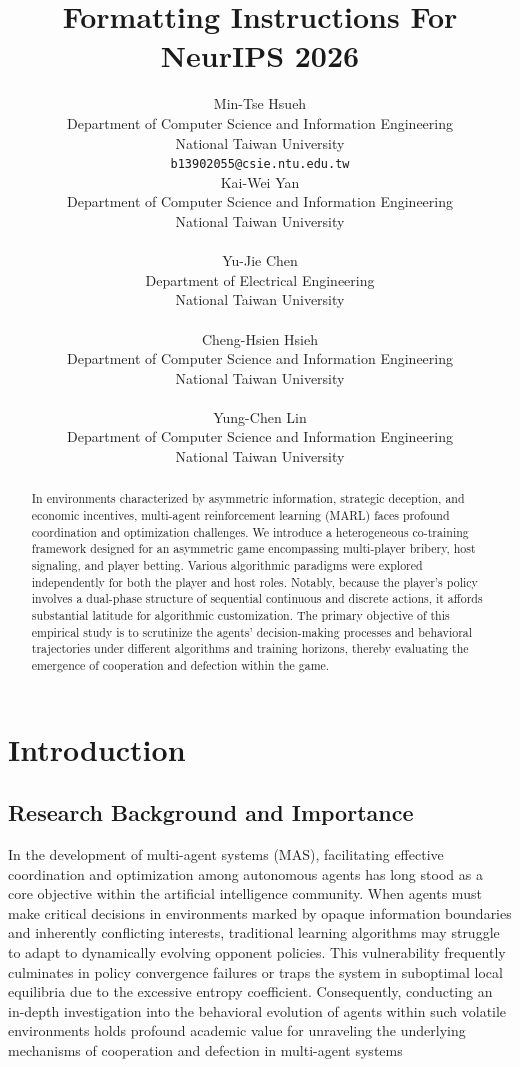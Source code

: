 \documentclass{article}
\title{Formatting Instructions For NeurIPS 2026}
\author{%
  Min-Tse Hsueh\\
  Department of Computer Science and Information Engineering\\
  National Taiwan University\\
  \texttt{b13902055@csie.ntu.edu.tw}\\
  \AND 
  Kai-Wei Yan\\
  Department of Computer Science and Information Engineering\\
  National Taiwan University\\
  \texttt{}\\ %
  \AND 
  Yu-Jie Chen\\
  Department of Electrical Engineering\\
  National Taiwan University\\
  \texttt{}\\ %
  \AND
  Cheng-Hsien Hsieh\\
  Department of Computer Science and Information Engineering\\
  National Taiwan University\\
  \texttt{}\\ %
  \AND
  Yung-Chen Lin\\
  Department of Computer Science and Information Engineering\\
  National Taiwan University\\
  \texttt{} %
}
\begin{document}
\maketitle

\begin{abstract}
In environments characterized by asymmetric information, strategic deception, and economic incentives, multi-agent reinforcement learning (MARL) faces profound coordination and optimization challenges. We introduce a heterogeneous co-training framework designed for an asymmetric game encompassing multi-player bribery, host signaling, and player betting. Various algorithmic paradigms were explored independently for both the player and host roles. Notably, because the player’s policy involves a dual-phase structure of sequential continuous and discrete actions, it affords substantial latitude for algorithmic customization. The primary objective of this empirical study is to scrutinize the agents' decision-making processes and behavioral trajectories under different algorithms and training horizons, thereby evaluating the emergence of cooperation and defection within the game.
\end{abstract}



\section{Introduction}

\subsection{Research Background and Importance}

In the development of multi-agent systems (MAS), facilitating effective coordination and optimization among autonomous agents has long stood as a core objective within the artificial intelligence community. 
When agents must make critical decisions in environments marked by opaque information boundaries and inherently conflicting interests, traditional learning algorithms may struggle to adapt to dynamically evolving opponent policies.
This vulnerability frequently culminates in policy convergence failures or traps the system in suboptimal local equilibria due to the excessive entropy coefficient. %
Consequently, conducting an in-depth investigation into the behavioral evolution of agents within such volatile environments holds profound academic value for unraveling the underlying mechanisms of cooperation and defection in multi-agent systems 
\end{document}
